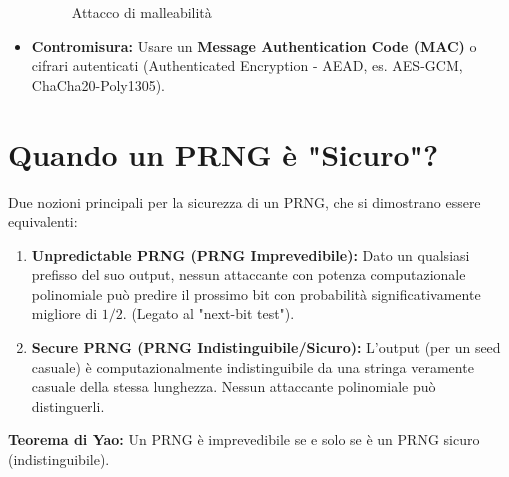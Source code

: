 \documentclass{article}
\begin{document}
\begin{itemize}
\begin{figure}[H]
    \caption{Attacco di malleabilità}
    \end{figure}
    \item \textbf{Contromisura:} Usare un \textbf{Message Authentication Code (MAC)} o cifrari autenticati (Authenticated Encryption - AEAD, es. AES-GCM, ChaCha20-Poly1305).
\end{itemize}

\section{Quando un PRNG è "Sicuro"?}
Due nozioni principali per la sicurezza di un PRNG, che si dimostrano essere equivalenti:
\begin{enumerate}
    \item \textbf{Unpredictable PRNG (PRNG Imprevedibile):}
    Dato un qualsiasi prefisso del suo output, nessun attaccante con potenza computazionale polinomiale può predire il prossimo bit con probabilità significativamente migliore di $1/2$. (Legato al "next-bit test").
    \item \textbf{Secure PRNG (PRNG Indistinguibile/Sicuro):}
    L'output (per un seed casuale) è computazionalmente indistinguibile da una stringa veramente casuale della stessa lunghezza. Nessun attaccante polinomiale può distinguerli.
\end{enumerate}
\textbf{Teorema di Yao:} Un PRNG è imprevedibile se e solo se è un PRNG sicuro (indistinguibile).
\end{document}
